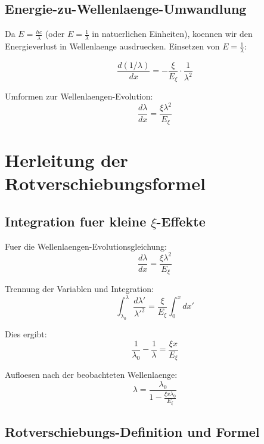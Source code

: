 \documentclass[12pt,a4paper]{article}
\newcommand{\Exi}{E_\xi}
\newcommand{\lambdazero}{\lambda_0}
\theoremstyle{definition}
\begin{document}
	\subsection{Energie-zu-Wellenlaenge-Umwandlung}
	
	Da $E = \frac{hc}{\lambda}$ (oder $E = \frac{1}{\lambda}$ in natuerlichen Einheiten), koennen wir den Energieverlust in Wellenlaenge ausdruecken. Einsetzen von $E = \frac{1}{\lambda}$:
	
	\begin{equation}
		\frac{d(1/\lambda)}{dx} = -\frac{\xi}{\Exi} \cdot \frac{1}{\lambda^2}
	\end{equation}
	
	Umformen zur Wellenlaengen-Evolution:
	\begin{equation}
		\frac{d\lambda}{dx} = \frac{\xi \lambda^2}{\Exi}
	\end{equation}
	
	\section{Herleitung der Rotverschiebungsformel}
	
	\subsection{Integration fuer kleine $\xi$-Effekte}
	
	Fuer die Wellenlaengen-Evolutionsgleichung:
	\begin{equation}
		\frac{d\lambda}{dx} = \frac{\xi \lambda^2}{\Exi}
	\end{equation}
	
	Trennung der Variablen und Integration:
	\begin{equation}
		\int_{\lambdazero}^{\lambda} \frac{d\lambda'}{\lambda'^2} = \frac{\xi}{\Exi} \int_0^x dx'
	\end{equation}
	
	Dies ergibt:
	\begin{equation}
		\frac{1}{\lambdazero} - \frac{1}{\lambda} = \frac{\xi x}{\Exi}
	\end{equation}
	
	Aufloesen nach der beobachteten Wellenlaenge:
	\begin{equation}
		\lambda = \frac{\lambdazero}{1 - \frac{\xi x \lambdazero}{\Exi}}
	\end{equation}
	
	\subsection{Rotverschiebungs-Definition und Formel}
	
\end{document}
